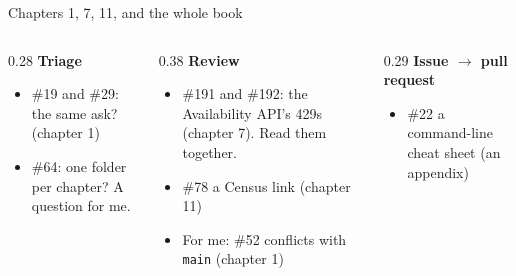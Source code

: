 \documentclass[9pt,aspectratio=169]{beamer}
\begin{document}
\begin{frame}{Chapters 1, 7, 11, and the whole book}
    \begin{columns}[T]
        \begin{column}{0.28\textwidth}
            \textbf{Triage}
            \begin{itemize}\small
                \item \#19 and \#29: the same ask? (chapter 1)
                \item \#64: one folder per chapter? A question for me.
            \end{itemize}
        \end{column}
        \begin{column}{0.38\textwidth}
            \textbf{Review}
            \begin{itemize}\small
                \item \#191 and \#192: the Availability API's 429s (chapter 7). Read them together.
                \item \#78 a Census link (chapter 11)
                \item For me: \#52 conflicts with \texttt{main} (chapter 1)
            \end{itemize}
        \end{column}
        \begin{column}{0.29\textwidth}
            \textbf{Issue $\to$ pull request}
            \begin{itemize}\small
                \item \#22 a command-line cheat sheet (an appendix)
            \end{itemize}
        \end{column}
    \end{columns}
\end{frame}
\end{document}
